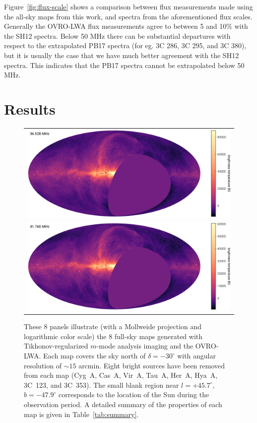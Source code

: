 \documentclass[twocolumn]{aastex61}
\begin{document}
Figure~\ref{fig:flux-scale} shows a comparison between flux measurements made using the all-sky maps
from this work, and spectra from the aforementioned flux scales. Generally the OVRO-LWA flux
measurements agree to between 5 and 10\% with the SH12 spectra. Below 50 MHz there can be
substantial departures with respect to the extrapolated PB17 spectra (for eg.  3C 286, 3C 295, and
3C 380), but it is usually the case that we have much better agreement with the SH12 spectra. This
indicates that the PB17 spectra cannot be extrapolated below 50 MHz.

\section{Results}\label{sec:results}

\begin{figure}[ht]
    \centering
    \begin{tabular}{c}
        \includegraphics[height=0.32\textheight]{figures/channel-maps/spw04} \\
        \includegraphics[height=0.32\textheight]{figures/channel-maps/spw06} \\
    \end{tabular}
    \caption{
        These 8 panels illustrate (with a Mollweide projection and logarithmic color scale) the 8
        full-sky maps generated with Tikhonov-regularized $m$-mode analysis imaging and the
        OVRO-LWA.  Each map covers the sky north of $\delta=-30^\circ$ with angular resolution of
        $\sim15$ arcmin. Eight bright sources have been removed from each map (Cyg~A, Cas~A, Vir~A,
        Tau~A, Her~A, Hya~A, 3C~123, and 3C~353). The small blank region near $l=+45.7^\circ$,
        $b=-47.9^\circ$ corresponds to the location of the Sun during the observation period.  A
        detailed summary of the properties of each map is given in Table~\ref{tab:summary}.
    }
    \label{fig:channel-maps}
\end{figure}
\end{document}

